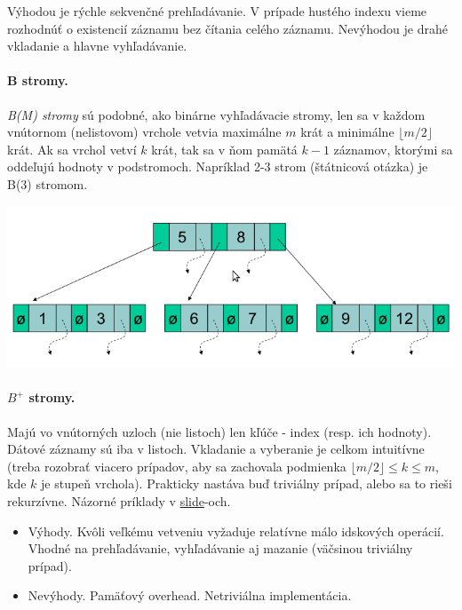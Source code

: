 \documentclass[10pt,a4paper]{article}
\begin{document}
Výhodou je rýchle sekvenčné prehľadávanie. V prípade hustého indexu vieme rozhodnúť o existencií záznamu bez čítania celého záznamu. 
Nevýhodou je drahé vkladanie a hlavne vyhľadávanie. 

\paragraph{B stromy.}
\emph{B(M) stromy} sú podobné, ako binárne vyhľadávacie stromy, len sa v každom vnútornom (nelistovom) vrchole vetvia maximálne $m$ krát a minimálne $\lfloor m/2 \rfloor$ krát. Ak sa vrchol vetví $k$ krát, tak sa v ňom pamätá $k-1$ záznamov, ktorými sa oddeľujú hodnoty v podstromoch. Napríklad 2-3 strom (štátnicová otázka) je B(3) stromom. 
 
\begin{center}
\includegraphics[scale=0.5]{db_bm_tree.png}
\end{center}

\paragraph{$B^+$ stromy.}
Majú vo vnútorných uzloch (nie listoch) len kľúče - index (resp. ich hodnoty). Dátové záznamy sú iba v listoch. 
Vkladanie a vyberanie je celkom intuitívne (treba rozobrať viacero prípadov, aby sa zachovala podmienka $\lfloor m/2 \rfloor \leq k \leq m$, kde $k$ je stupeň vrchola). Prakticky nastáva buď triviálny prípad, alebo sa to rieši rekurzívne. Názorné príklady v \href{http://www.dcs.fmph.uniba.sk/~plachetk/TEACHING/DB2011/db2011_10.pdf}{slide}-och. 

\begin{itemize}
\item Výhody. Kvôli veľkému vetveniu vyžaduje relatívne málo idskových operácií. Vhodné na prehľadávanie, vyhľadávanie aj mazanie (väčsinou triviálny prípad). 
\item Nevýhody. Pamäťový overhead. Netriviálna implementácia. 
\end{itemize}
\end{document}
